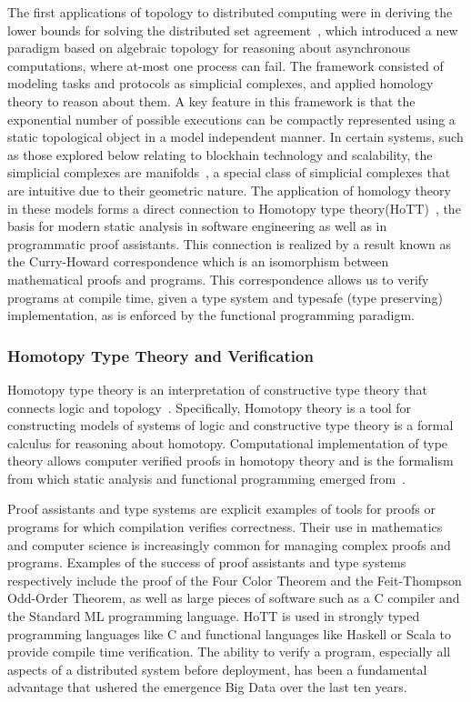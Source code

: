 \documentclass[runningheads]{llncs}
\begin{document}
The first applications of topology to distributed computing were in deriving the lower bounds for solving the distributed set agreement~\cite{ref_article12}, which introduced a new paradigm based on algebraic topology for reasoning about asynchronous computations, where at-most one process can fail. The framework consisted of modeling tasks and protocols as simplicial complexes, and applied homology~\cite{ref_article5,ref_article9} theory to reason about them. A key feature in this framework is that the exponential number of possible executions can be compactly represented using a static topological object in a model independent manner. In certain systems, such as those explored below relating to blockhain technology and scalability, the simplicial complexes are manifolds~\cite{ref_article6,ref_article7,ref_article8}, a special class of simplicial complexes that are intuitive due to their geometric nature. The application of homology theory in these models forms a direct connection to Homotopy type theory(HoTT)~\cite{ref_article9,ref_article10}, the basis for modern static analysis in software engineering as well as in programmatic proof assistants. This connection is realized by a result known as the Curry-Howard correspondence which is an isomorphism between mathematical proofs and programs. This correspondence allows us to verify programs at compile time, given a type system and typesafe (type preserving) implementation, as is enforced by the functional programming paradigm.

\subsubsection{Homotopy Type Theory and Verification}
Homotopy type theory is an interpretation of constructive type theory that connects logic and topology~\cite{ref_book1}. Specifically, Homotopy theory is a tool for constructing models of systems of logic and constructive type theory is a formal calculus for reasoning about homotopy. Computational implementation of type theory allows computer verified proofs in homotopy theory and is the formalism from which static analysis and functional programming emerged from~\cite{ref_article10}.

Proof assistants and type systems are explicit examples of tools for proofs or programs for which compilation verifies correctness. Their use in mathematics and computer science is increasingly common for managing complex proofs and programs. Examples of the success of proof assistants and type systems respectively include the proof of the Four Color Theorem and the Feit-Thompson Odd-Order Theorem, as well as large pieces of software such as a C compiler and the Standard ML programming language. HoTT is used in strongly typed programming languages like C and functional languages like Haskell or Scala to provide compile time verification. The ability to verify a program, especially all aspects of a distributed system before deployment, has been a fundamental advantage that ushered the emergence Big Data over the last ten years.
\end{document}
